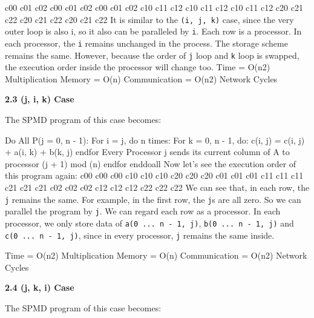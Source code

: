 \documentclass{article}%
\newenvironment{code}%
   {\snugshade\verbatim}%
   {\endverbatim\endsnugshade}
\begin{document}
\begin{Large}
\begin{code}
    c00 c01 c02 c00 c01 c02 c00 c01 c02 
    c10 c11 c12 c10 c11 c12 c10 c11 c12
    c20 c21 c22 c20 c21 c22 c20 c21 c22
\end{code}
It is similar to the \texttt{(i, j, k)} case, since the very outer loop is also i, so it also can be paralleled by \texttt{i}. Each row is a processor. In each processor, the \texttt{i} remains unchanged in the process. The storage scheme remains the same. However, because the order of \texttt{j} loop and \texttt{k} loop is swapped, the execution order inside the processor will change too.
\begin{code}
Time = O(n2) Multiplication
Memory = O(n)
Communication = O(n2) Network Cycles
\end{code}

\begin{LARGE}

\begin{flushleft}
\textbf{2.3 (j, i, k) Case}
\end{flushleft}
\end{LARGE}
The SPMD program of this case becomes:
\newpage

\begin{code}
    Do All P(j = 0, n - 1):
        For i = j, do n times:
            For k = 0, n - 1, do:
                c(i, j) = c(i, j) + a(i, k) + b(k, j)
            endfor
        Every Processor j sends its current 
        column of A to processor (j + 1) mod (n)
        endfor
    enddoall
\end{code}
Now let's see the execution order of this program again:
\begin{code}
    c00 c00 c00 c10 c10 c10 c20 c20 c20 
    c01 c01 c01 c11 c11 c11 c21 c21 c21
    c02 c02 c02 c12 c12 c12 c22 c22 c22
\end{code}
We can see that, in each row, the \texttt{j} remains the same. For example, in the first row, the \texttt{j}s are all zero. So we can parallel the program by \texttt{j}. We can regard each row as a processor. In each processor, we only store data of \texttt{a(0 ... n - 1, j)}, \texttt{b(0 ... n - 1, j)} and \texttt{c(0 ... n - 1, j)}, since in every processor, \texttt{j} remains the same inside.

\begin{code}
Time = O(n2) Multiplication
Memory = O(n)
Communication = O(n2) Network Cycles
\end{code}

\begin{LARGE}
\begin{flushleft}
\textbf{2.4 (j, k, i) Case}
\end{flushleft}
\end{LARGE}
The SPMD program of this case becomes:


\end{Large}
\end{document}
